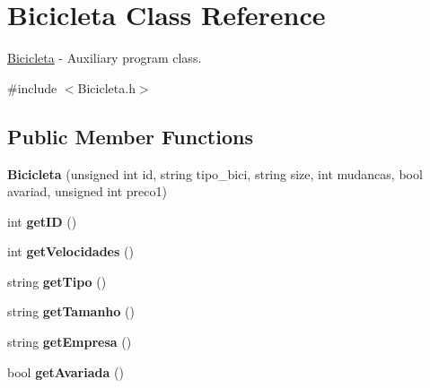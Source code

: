 \hypertarget{class_bicicleta}{\section{Bicicleta Class Reference}
\label{class_bicicleta}
}


\hyperlink{class_bicicleta}{Bicicleta} -\/ Auxiliary program class.  




{\ttfamily \#include $<$Bicicleta.\+h$>$}

\subsection*{Public Member Functions}
\begin{DoxyCompactItemize}
\item 
\hypertarget{class_bicicleta_af248a13124a9939cc3fa8eb3be56fdaf}{{\bfseries Bicicleta} (unsigned int id, string tipo\+\_\+bici, string size, int mudancas, bool avariad, unsigned int preco1)}\label{class_bicicleta_af248a13124a9939cc3fa8eb3be56fdaf}

\item 
\hypertarget{class_bicicleta_ac85afd4971d0b6eada6eb16f9a924118}{int {\bfseries get\+I\+D} ()}\label{class_bicicleta_ac85afd4971d0b6eada6eb16f9a924118}

\item 
\hypertarget{class_bicicleta_a956979f7f43934c329b143b9d6c2da49}{int {\bfseries get\+Velocidades} ()}\label{class_bicicleta_a956979f7f43934c329b143b9d6c2da49}

\item 
\hypertarget{class_bicicleta_a4582ea6f608f9d188df0b563961d7df5}{string {\bfseries get\+Tipo} ()}\label{class_bicicleta_a4582ea6f608f9d188df0b563961d7df5}

\item 
\hypertarget{class_bicicleta_a9733b1f60caff10aa814dfe38e8e459f}{string {\bfseries get\+Tamanho} ()}\label{class_bicicleta_a9733b1f60caff10aa814dfe38e8e459f}

\item 
\hypertarget{class_bicicleta_a98ab039cfa35975f6d1ff2223a625a7f}{string {\bfseries get\+Empresa} ()}\label{class_bicicleta_a98ab039cfa35975f6d1ff2223a625a7f}

\item 
\hypertarget{class_bicicleta_adcf9b86f83a83b15c98f70918469e664}{bool {\bfseries get\+Avariada} ()}\label{class_bicicleta_adcf9b86f83a83b15c98f70918469e664}


\end{DoxyCompactItemize}
